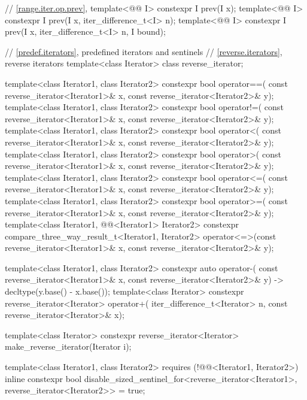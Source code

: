 \begin{codeblock}
{{    // \ref{range.iter.op.prev}, 
    template<@@ I>
      constexpr I prev(I x);
    template<@@ I>
      constexpr I prev(I x, iter_difference_t<I> n);
    template<@@ I>
      constexpr I prev(I x, iter_difference_t<I> n, I bound);
  }

  // \ref{predef.iterators}, predefined iterators and sentinels
  // \ref{reverse.iterators}, reverse iterators
  template<class Iterator> class reverse_iterator;

  template<class Iterator1, class Iterator2>
    constexpr bool operator==(
      const reverse_iterator<Iterator1>& x,
      const reverse_iterator<Iterator2>& y);
  template<class Iterator1, class Iterator2>
    constexpr bool operator!=(
      const reverse_iterator<Iterator1>& x,
      const reverse_iterator<Iterator2>& y);
  template<class Iterator1, class Iterator2>
    constexpr bool operator<(
      const reverse_iterator<Iterator1>& x,
      const reverse_iterator<Iterator2>& y);
  template<class Iterator1, class Iterator2>
    constexpr bool operator>(
      const reverse_iterator<Iterator1>& x,
      const reverse_iterator<Iterator2>& y);
  template<class Iterator1, class Iterator2>
    constexpr bool operator<=(
      const reverse_iterator<Iterator1>& x,
      const reverse_iterator<Iterator2>& y);
  template<class Iterator1, class Iterator2>
    constexpr bool operator>=(
      const reverse_iterator<Iterator1>& x,
      const reverse_iterator<Iterator2>& y);
  template<class Iterator1, @@<Iterator1> Iterator2>
    constexpr compare_three_way_result_t<Iterator1, Iterator2>
      operator<=>(const reverse_iterator<Iterator1>& x,
                  const reverse_iterator<Iterator2>& y);

  template<class Iterator1, class Iterator2>
    constexpr auto operator-(
      const reverse_iterator<Iterator1>& x,
      const reverse_iterator<Iterator2>& y) -> decltype(y.base() - x.base());
  template<class Iterator>
    constexpr reverse_iterator<Iterator> operator+(
      iter_difference_t<Iterator> n,
      const reverse_iterator<Iterator>& x);

  template<class Iterator>
    constexpr reverse_iterator<Iterator> make_reverse_iterator(Iterator i);

  template<class Iterator1, class Iterator2>
      requires (!@@<Iterator1, Iterator2>)
    inline constexpr bool disable_sized_sentinel_for<reverse_iterator<Iterator1>,
                                                     reverse_iterator<Iterator2>> = true;

}
\end{codeblock}
